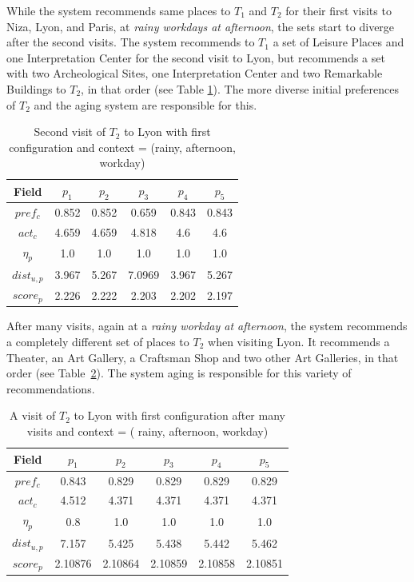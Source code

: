 While the system recommends same places to $T_1$ and $T_2$ for their first visits to Niza, Lyon, and Paris, at {\it  rainy workdays at afternoon}, the sets start to diverge after the second visits. The system recommends to $T_1$ a set of Leisure Places and one Interpretation Center for the second visit to Lyon, but recommends a set with two Archeological Sites, one Interpretation Center and two Remarkable Buildings to $T_2$, in that order (see Table \ref{table:t2-1}). The more diverse initial preferences of $T_2$ and the aging system are responsible for this.

\begin{table}[h!]
    \centering
        \caption{Second visit of $T_2$ to Lyon with first configuration and context = (rainy, afternoon, workday)}
    \label{table:t2-1}
    \begin{tabular}{ |c|c|c|c|c|c| } 
        \hline
        Field   & $p_1$ & $p_2$ & $p_3$ & $p_4$ & $p_5$ \\
        \hline
        $pref_c$    &  0.852 & 0.852 & 0.659 & 0.843 & 0.843 \\
        $act_c$     & 4.659 & 4.659 & 4.818 & 4.6 & 4.6 \\
        $\eta_p$    & 1.0 & 1.0 & 1.0 & 1.0 & 1.0 \\
        $dist_{u,p}$ & 3.967 & 5.267 & 7.0969 & 3.967 & 5.267 \\
        $score_p$    & 2.226 & 2.222 & 2.203 & 2.202 & 2.197 \\
        
        \hline
    \end{tabular}
\end{table}

After many visits, again at a {\it  rainy workday at afternoon}, the system recommends a completely different set of places to $T_2$ when visiting Lyon.
It recommends a Theater, an Art Gallery, a Craftsman Shop and two other Art Galleries, in that order (see Table~\ref{table:t2-2}). The system aging is responsible for this variety of recommendations.

\begin{table}[h!]
    \centering
    \caption{A visit of $T_2$ to Lyon with first configuration after many visits and context = ( rainy, afternoon, workday)}
    \label{table:t2-2}
    \begin{tabular}{ |c|c|c|c|c|c| } 
        \hline
        Field   & $p_1$ & $p_2$ & $p_3$ & $p_4$ & $p_5$ \\
        \hline
        $pref_c$    &  0.843 & 0.829 & 0.829 & 0.829 & 0.829 \\
        $act_c$     & 4.512 & 4.371 & 4.371 & 4.371 & 4.371 \\
        $\eta_p$    & 0.8 & 1.0 & 1.0 & 1.0 & 1.0 \\
        $dist_{u,p}$ & 7.157 & 5.425 & 5.438 & 5.442 & 5.462 \\
        $score_p$    & 2.10876 & 2.10864 & 2.10859 & 2.10858 & 2.10851 \\
        
        \hline
    \end{tabular}
\end{table}

